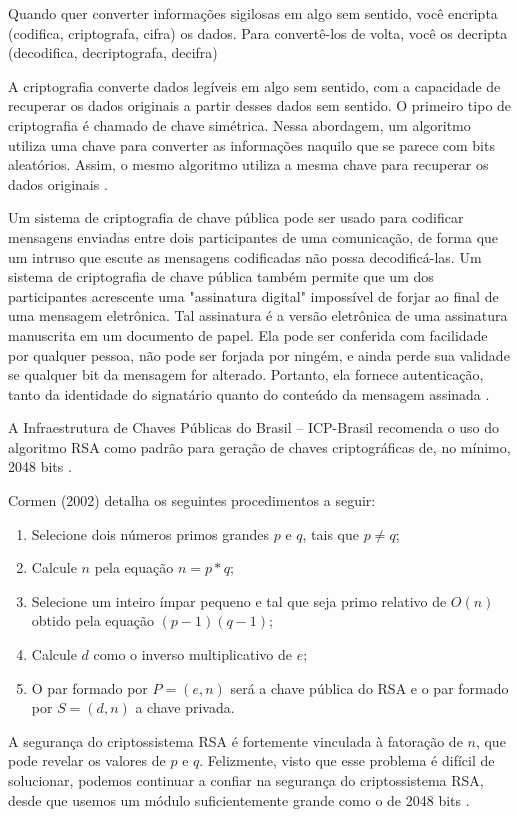 Quando quer converter informações sigilosas em algo sem sentido, você encripta (codifica, criptografa, cifra) os dados. Para convertê-los de volta, você os decripta (decodifica, decriptografa, decifra)

A criptografia converte dados legíveis em algo sem sentido, com a capacidade de recuperar os dados originais a partir desses dados sem sentido. O primeiro tipo de criptografia é chamado de chave simétrica. Nessa abordagem, um algoritmo utiliza uma chave para converter as informações naquilo que se parece com bits aleatórios. Assim, o mesmo algoritmo utiliza a mesma chave para recuperar os dados originais \cite{burnett:02}.



Um sistema de criptografia de chave pública pode ser usado para codificar mensagens enviadas entre dois participantes de uma comunicação, de forma que um intruso que escute as mensagens codificadas não possa decodificá-las. Um sistema de criptografia de chave pública também permite que um dos participantes acrescente uma "assinatura digital" impossível de forjar ao final de uma mensagem eletrônica. Tal assinatura é a versão eletrônica de uma assinatura manuscrita em um documento de papel. Ela pode ser conferida com facilidade por qualquer pessoa, não pode ser forjada por ningém, e ainda perde sua validade se qualquer bit da mensagem for alterado. Portanto, ela fornece autenticação, tanto da identidade do signatário quanto do conteúdo da mensagem assinada \cite{cormen:02}.

A Infraestrutura de Chaves Públicas do Brasil – ICP-Brasil recomenda o uso do algoritmo RSA como padrão para geração de chaves criptográficas de, no mínimo, 2048 bits \cite{icp:09}.

Cormen (2002) detalha os seguintes procedimentos a seguir:
\begin{enumerate}
    \item Selecione dois números primos grandes $p$ e $q$, tais que $p \neq q$;
    \item Calcule $n$ pela equação $n=p*q$;
    \item Selecione um inteiro ímpar pequeno e tal que seja primo relativo de  $O(n)$  obtido pela equação $(p-1)(q-1)$;
    \item Calcule $d$ como o inverso multiplicativo de $e$;
    \item O par formado por $P = (e,n)$ será a chave pública do RSA  e o par formado por $S = (d,n)$ a chave privada.
\end{enumerate}


A segurança do criptossistema RSA é fortemente vinculada à fatoração de $n$, que pode revelar os valores de $p$ e $q$. Felizmente, visto que esse problema é difícil de solucionar, podemos continuar a confiar na segurança do criptossistema RSA, desde que usemos um módulo suficientemente grande como o de 2048 bits \cite{goodrich:13}.